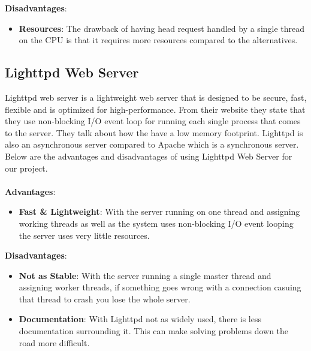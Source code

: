 \documentclass[onecolumn, draftclsnofoot,10pt, compsoc]{IEEEtran}
\begin{document}
		\noindent\textbf{Disadvantages}:
		\begin{itemize}
			\item \textbf{Resources}: The drawback of having head request
			handled by a single thread on the CPU is that it requires more resources
			compared to the alternatives.
		\end{itemize}

		\subsection{Lighttpd Web Server}
		Lighttpd web server is a lightweight web server that is designed to be secure,
		fast, flexible and is optimized for high-performance. From their website \cite{Lighttpd}
		they state that they use non-blocking I/O event loop for running each single
		process that comes to the server. They talk about how the have a low memory
		footprint. Lighttpd is also an asynchronous server compared to Apache which is
		a synchronous server. Below are the advantages and disadvantages of using
		Lighttpd Web Server for our project.
		\\\\
		\textbf{Advantages}:
		\begin{itemize}
			\item \textbf{Fast & Lightweight}: With the server running on one thread
			and assigning working threads as well as the system uses non-blocking I/O
			event looping the server uses very little resources.
		\end{itemize}
		\noindent\textbf{Disadvantages}:
		\begin{itemize}
			\item \textbf{Not as Stable}: With the server running a single master thread
			and assigning worker threads, if something goes wrong with a connection casuing
			that thread to crash you lose the whole server.
			\item \textbf{Documentation}: With Lighttpd not as widely used, there
			is less documentation surrounding it. This can make solving problems down the
			road more difficult.
		\end{itemize}
\end{document}
